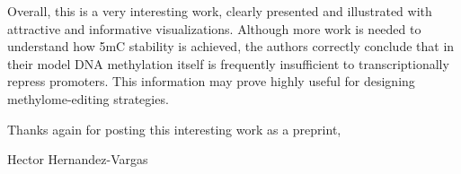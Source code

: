 \documentclass[10pt]{article}
\begin{document}
Overall, this is a very interesting work, clearly presented and
illustrated with attractive and informative visualizations. Although
more work is needed to understand how 5mC stability is achieved, the
authors correctly conclude that in their model DNA methylation itself is
frequently insufficient to transcriptionally repress promoters. This
information may prove highly useful for designing methylome-editing
strategies.

\par\null

Thanks again for posting this interesting work as a preprint,

Hector Hernandez-Vargas

\FloatBarrier
\end{document}
